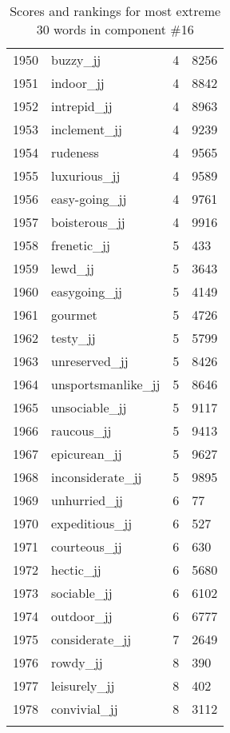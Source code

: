 \begin{longtable}[!htbp]{| rlr@{.}l |}
    1950 & buzzy\_jj & 4 & 8256 \\
    1951 & indoor\_jj & 4 & 8842 \\
    1952 & intrepid\_jj & 4 & 8963 \\
    1953 & inclement\_jj & 4 & 9239 \\
    1954 & rudeness & 4 & 9565 \\
    1955 & luxurious\_jj & 4 & 9589 \\
    1956 & easy-going\_jj & 4 & 9761 \\
    1957 & boisterous\_jj & 4 & 9916 \\
    1958 & frenetic\_jj & 5 & 433 \\
    1959 & lewd\_jj & 5 & 3643 \\
    1960 & easygoing\_jj & 5 & 4149 \\
    1961 & gourmet & 5 & 4726 \\
    1962 & testy\_jj & 5 & 5799 \\
    1963 & unreserved\_jj & 5 & 8426 \\
    1964 & unsportsmanlike\_jj & 5 & 8646 \\
    1965 & unsociable\_jj & 5 & 9117 \\
    1966 & raucous\_jj & 5 & 9413 \\
    1967 & epicurean\_jj & 5 & 9627 \\
    1968 & inconsiderate\_jj & 5 & 9895 \\
    1969 & unhurried\_jj & 6 & 77 \\
    1970 & expeditious\_jj & 6 & 527 \\
    1971 & courteous\_jj & 6 & 630 \\
    1972 & hectic\_jj & 6 & 5680 \\
    1973 & sociable\_jj & 6 & 6102 \\
    1974 & outdoor\_jj & 6 & 6777 \\
    1975 & considerate\_jj & 7 & 2649 \\
    1976 & rowdy\_jj & 8 & 390 \\
    1977 & leisurely\_jj & 8 & 402 \\
    1978 & convivial\_jj & 8 & 3112 \\
    \hline
    \caption{Scores and rankings for most extreme 30 words in component \#16} \\
\end{longtable}
